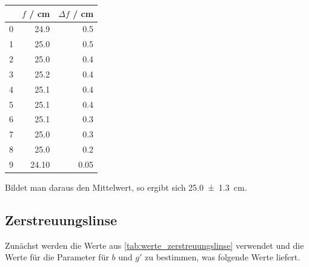 \documentclass[11pt,ngerman]{scrartcl}
\begin{document}
\begin{center}
	\begin{tabular}{lrr}
		\toprule
		{} & $f$ / cm & $\Delta f$ / cm \\
		\midrule
		0  & 24.9     & 0.5             \\
		1  & 25.0     & 0.5             \\
		2  & 25.0     & 0.4             \\
		3  & 25.2     & 0.4             \\
		4  & 25.1     & 0.4             \\
		5  & 25.1     & 0.4             \\
		6  & 25.1     & 0.3             \\
		7  & 25.0     & 0.3             \\
		8  & 25.0     & 0.2             \\
		9  & 24.10    & 0.05            \\
		\bottomrule
	\end{tabular}
\end{center}

Bildet man daraus den Mittelwert, so ergibt sich \SI{25.0(13)}{\cm}.

\newpage

\subsection{Zerstreuungslinse}

Zunächst werden die Werte aus \autoref{tab:werte_zerstreuungslinse} verwendet und die Werte für die Parameter für $b$ und $g'$ zu bestimmen, was folgende Werte liefert.
\end{document}
